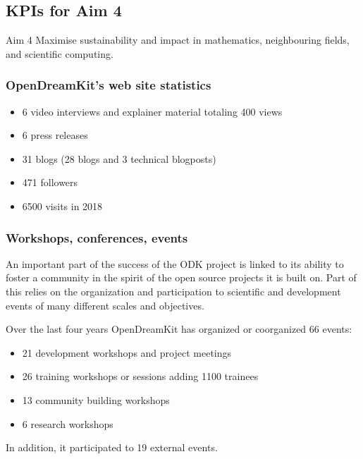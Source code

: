\subsection{KPIs for Aim 4}

\begin{recommendation}{Aim 4}
  Maximise sustainability and impact in mathematics, neighbouring
  fields, and scientific computing.
\end{recommendation}

\subsubsection{OpenDreamKit's web site statistics}

\begin{itemize}
\item 6 video interviews and explainer material totaling 400 views
\item 6 press releases
\item 31 blogs (28 blogs and 3 technical blogposts)
\item 471 followers
\item 6500 visits in 2018
\end{itemize}

\subsubsection{Workshops, conferences, events}



An important part of the success of the ODK project is linked to its
ability to foster a community in the spirit of the open source
projects it is built on. Part of this relies on the organization and
participation to scientific and development events of many different
scales and objectives.

Over the last four years OpenDreamKit has organized or coorganized 66
events:
\begin{itemize}
\item 21 development workshops and project meetings
\item 26 training workshops or sessions adding 1100 trainees
\item 13 community building workshops
\item 6 research workshops
\end{itemize}
In addition, it participated to 19 external events.

